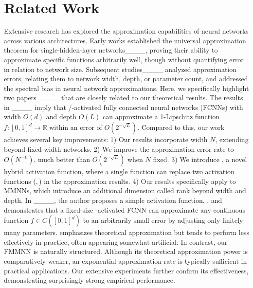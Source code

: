 \section{Related Work}
\label{sec:related:work}


Extensive research has explored the approximation capabilities of neural networks across various architectures. Early works established the universal approximation theorem for single-hidden-layer networks____, proving their ability to approximate specific functions arbitrarily well, though without quantifying error in relation to network size. Subsequent studies____ analyzed approximation errors, relating them to network width, depth, or parameter count, and addressed the spectral bias in neural network approximations. 
Here, we specifically highlight two papers ____ that are closely related to our theoretical results.
 The results in ____ imply that \ReLU/\sine-activated fully connected neural networks (FCNNs) with width $O(d)$ and depth $O(L)$ can approximate a 1-Lipschitz function $f:[0,1]^d\to\mathbb{R}$ within an error of $O(2^{-\sqrt{L}})$. Compared to this, our work achieves several key improvements: 
1) Our results incorporate width $N$, extending beyond fixed-width networks.  
2) We improve the approximation error rate to $O(N^{-L})$, much better than $O(2^{-\sqrt{L}})$ when $N$ fixed.  
3) We introduce \SinTU{}, a novel hybrid activation function, where a single \SinTU{} function can replace two activation functions (\ReLU,\,\sine) in the approximation results.  
4) Our results specifically apply to MMNNs, which introduce an additional dimension called rank beyond width and depth.  
In ____, the author proposes a simple activation function, \EUAF, and demonstrates that a fixed-size \EUAF-activated FCNN can approximate any continuous function $f\in C([0,1]^d)$ to an arbitrarily small error by adjusting only finitely many parameters. 
\EUAF{} emphasizes theoretical approximation but tends to perform less effectively in practice, often appearing somewhat artificial. 
In contrast, our FMMNN is naturally structured. Although its theoretical approximation power is comparatively weaker, an exponential approximation rate is typically sufficient in practical applications. Our extensive experiments further confirm its effectiveness, demonstrating surprisingly strong empirical performance.




